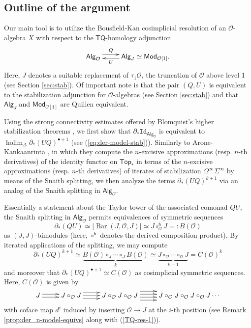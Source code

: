 \documentclass[11pt]{amsart}
\theoremstyle{definition}
\theoremstyle{remark}
\newcommand{\Top}{\mathsf{Top}_*}
\newcommand{\TQ}{\mathsf{TQ}}
\newcommand{\Sp}{\Sigma^{\infty}}
\newcommand{\U}{\Omega^{\infty}}
\newcommand{\holim}{\operatorname{holim}}
\newcommand{\Alg}[1]{ {\mathsf{Alg}_{\mathcal{#1}}} }
\newcommand{\Id}{\mathtt{Id}}
\newcommand{\Barr}{\operatorname{Bar}}
\newcommand{\Cal}[1]{\mathcal{#1}}
\begin{document}
\subsection{Outline of the argument}
Our main tool is to utilize the Bousfield-Kan cosimplicial resolution of an $\Cal{O}$-algebra $X$ with respect to the $\TQ$-homology adjunction \[ \xymatrix{
    \Alg{O} \ar@<.75ex>[r]^-{Q} & \textsf{Alg}_{J}\simeq \mathsf{Mod}_{\Cal{O}[1]}. \ar@<.5ex>[l]^-{U}
    }\] 
Here, $J$ denotes a suitable replacement of $\tau_1\Cal{O}$, the truncation of $\Cal{O}$ above level 1 (see Section \ref{sec:stab}). Of important note is that the pair $(Q,U)$ is equivalent to the stabilization adjunction for $\Cal{O}$-algebras (see Section \ref{sec:stab}) and that $\mathsf{Alg}_J$ and $\mathsf{Mod}_{\Cal{O}[1]}$ are Quillen equivalent. 

Using the strong connectivity estimates offered by Blomquist's higher stabilization theorems \cite[]{Blom}, we first show that $\partial_* \Id_{\Alg{O}}$ is equivalent to $\holim_{\Delta} \partial_*(UQ)^{\bullet+1}$ (see (\ref{eq:der-model-stab})). Similarly to Arone-Kankaanrinta \cite{AK}, in which they compute the $n$-excisive approximations (resp. $n$-th derivatives) of the identity functor on $\Top$ in terms of the $n$-excisive approximations (resp. $n$-th derivatives) of iterates of stabilization $\U \Sp$ by means of the Snaith splitting, we then analyze the terms $\partial_*(UQ)^{k+1}$ via an analog of the Snaith splitting in $\Alg{O}$.

 Essentially a statement about the Taylor tower of the associated comonad $QU$, the Snaith splitting in $\Alg{O}$ permits equivalences of symmetric sequences\[\partial_*(QU)\simeq  |\Barr(J, \Cal{O}, J)|\simeq J\circ^{\mathsf{h}}_{\Cal{O}} J =:B(\Cal{O})\] as $(J,J)$-bimodules (here, $\circ^{\mathsf{h}}$ denotes the derived composition product). By iterated applications of the splitting, we may compute \[\partial_*(UQ)^{k+1}\simeq \underbrace{B(\Cal{O}) \circ_J \cdots \circ_J B(\Cal{O})}_{k}\simeq \underbrace{J\circ_{\Cal{O}}\cdots  \circ_{\Cal{O}} J}_{k+1}= C(\Cal{O})^k\] and moreover that $\partial_*(UQ)^{\bullet+1}\simeq C(\Cal{O})$ as cosimplicial symmetric sequences. Here, $C(\Cal{O})$ is given by \[\xymatrix{
    J \ar@<.5ex>[r] \ar@<-.5ex>[r] &
    J\circ_{\Cal{O}}J \ar@<-1ex>[r] \ar[r] \ar@<1ex>[r] &
    J\circ_{\Cal{O}}J \circ_{\Cal{O}}J \ar@<-1.5ex>[r] \ar@<-.5ex>[r] \ar@<.5ex>[r] \ar@<1.5 ex>[r] &
    J\circ_{\Cal{O}}J \circ_{\Cal{O}}J\circ_{\Cal{O}} J \cdots
}\]
with coface map $d^i$ induced by inserting $\Cal{O}\to J$ at the $i$-th position (see Remark \ref{prop:der_n-model-equivs} along with (\ref{TQ-res-1})). 
\end{document}
